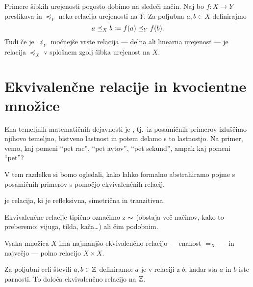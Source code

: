                 Primere šibkih urejenosti pogosto dobimo na sledeči način. Naj bo $f\colon X \to Y$ preslikava in $\preceq_Y$ neka relacija urejenosti na $Y$. Za poljubna $a, b \in X$ definirajmo
                \[a \preceq_X b \mathrel{\mathop:}= f(a) \preceq_Y f(b).\]
                Tudi če je $\preceq_Y$ močnejše vrste relacija --- delna ali linearna urejenost --- je relacija $\preceq_X$ v splošnem zgolj šibka urejenost na $X$.





        \section{Ekvivalenčne relacije in kvocientne množice}

                Ena temeljnih matematičnih dejavnosti je  , tj.~iz posamičnih primerov izluščimo njihovo temeljno, bistveno lastnost in potem delamo s to lastnostjo.  Na primer, vemo, kaj pomeni ``pet rac'', ``pet avtov'', ``pet sekund'', ampak kaj pomeni ``pet''?

                V tem razdelku si bomo ogledali, kako lahko formalno abstrahiramo pojme s posamičnih primerov s pomočjo ekvivalenčnih relacij.

                \begin{definicija}
                         je relacija, ki je refleksivna, simetrična in tranzitivna.
                \end{definicija}

                Ekvivalenčne relacije tipično označimo z $\sim$ (obstaja več načinov, kako to preberemo: vijuga, tilda, kača\ldots) ali čim podobnim.

                \begin{zgled}
                        Vsaka množica $X$ ima najmanjšo ekvivalenčno relacijo --- enakost $=_X$ --- in največjo --- polno relacijo $X \times X$.
                \end{zgled}

                \begin{zgled}
                        Za poljubni celi števili $a, b \in \mathbb{Z}$ definiramo: $a$ je v relaciji z $b$, kadar sta $a$ in $b$ iste parnosti. To določa ekvivalenčno relacijo na $\mathbb{Z}$.
                \end{zgled}


